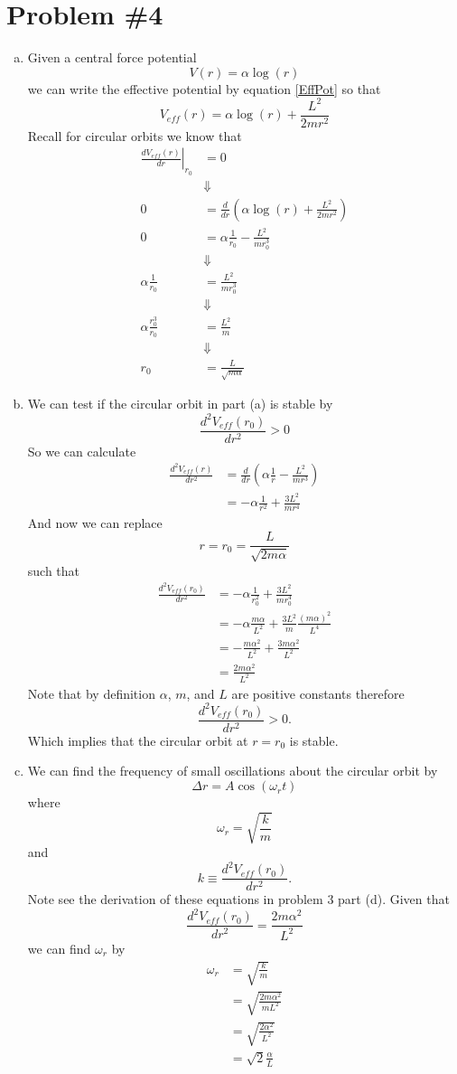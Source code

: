 \documentclass[11pt]{article}
\numberwithin{equation}{section}
\begin{document}
\section{Problem \#4}
\begin{enumerate}[(a)]
\item Given a central force potential 
$$V(r) = \alpha \log(r)$$
we can write the effective potential by equation \ref{EffPot} so that
$$V_{eff}(r) = \alpha\log(r) + \frac{L^2}{2mr^2}$$
Recall for circular orbits we know that
\begin{align*}
\left.\frac{dV_{eff}(r)}{dr}\right|_{r_0} &= 0\\
&\Downarrow\\
0 &= \frac{d}{dr}\left(\alpha\log(r) + \frac{L^2}{2mr^2}\right)\\
0 &= \alpha\frac{1}{r_0} - \frac{L^2}{mr_0^3}\\
&\Downarrow\\
\alpha\frac{1}{r_0} &=  \frac{L^2}{mr_0^3}\\
&\Downarrow\\
\alpha\frac{r_0^3}{r_0} &=  \frac{L^2}{m}\\
&\Downarrow\\
r_0 &=  \frac{L}{\sqrt{m\alpha}}
\end{align*}

\item We can test if the circular orbit in part (a) is stable by
$$\frac{d^2V_{eff}(r_0)}{dr^2} > 0$$
So we can calculate
\begin{align*}
\frac{d^2V_{eff}(r)}{dr^2} &= \frac{d}{dr}\left(\alpha\frac{1}{r}-\frac{L^2}{mr^3}\right)\\
&= -\alpha\frac{1}{r^2}+\frac{3L^2}{mr^4}
\end{align*}
And now we can replace 
$$r= r_0 = \frac{L}{\sqrt{2m\alpha}}$$
such that
\begin{align*}
\frac{d^2V_{eff}(r_0)}{dr^2} &= -\alpha\frac{1}{r_0^2}+\frac{3L^2}{mr_0^4}\\
&= -\alpha\frac{m\alpha}{L^2}+\frac{3L^2}{m}\frac{(m\alpha)^2}{L^4}\\
&= -\frac{m\alpha^2}{L^2}+\frac{3m\alpha^2}{L^2}\\
&= \frac{2m\alpha^2}{L^2}
\end{align*}
Note that by definition $\alpha$, $m$, and $L$ are positive constants therefore
$$\frac{d^2V_{eff}(r_0)}{dr^2} > 0.$$
Which implies that the circular orbit at $r=r_0$ is stable.

\item We can find the frequency of small oscillations about the circular orbit by
$$\Delta r = A\cos(\omega_r t)$$
where
$$\omega_r = \sqrt{\frac{k}{m}}$$
and
$$k \equiv \frac{d^2V_{eff}(r_0)}{dr^2}.$$
Note see the derivation of these equations in problem 3 part (d). Given that 
$$\frac{d^2V_{eff}(r_0)}{dr^2} = \frac{2m\alpha^2}{L^2}$$
we can find $\omega_r$ by
\begin{align*}
\omega_r &= \sqrt{\frac{k}{m}}\\
&= \sqrt{\frac{2m\alpha^2}{mL^2}}\\
&= \sqrt{\frac{2\alpha^2}{L^2}}\\
&= \sqrt{2}\frac{\alpha}{L}
\end{align*}


\end{enumerate}
\end{document}
